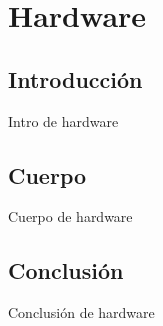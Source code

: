 \section{Hardware}

\subsection{Introducci\'on}
Intro de hardware

\subsection{Cuerpo}
Cuerpo de hardware

\subsection{Conclusi\'on}
Conclusi\'on de hardware


